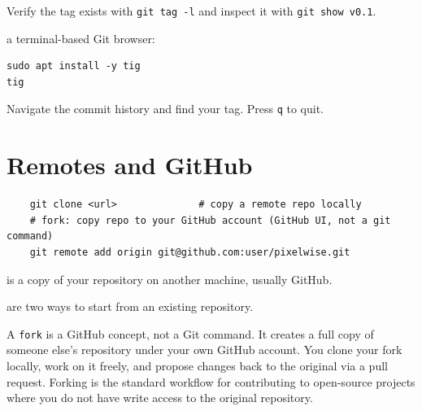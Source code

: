 Verify the tag exists with \texttt{git tag -l} and inspect it with \texttt{git show v0.1}.

 a terminal-based Git browser:

\begin{verbatim}
sudo apt install -y tig
tig
\end{verbatim}

Navigate the commit history and find your tag. Press \texttt{q} to quit.



\newpage
\section{Remotes and GitHub}




\begin{verbatim}
    git clone <url>              # copy a remote repo locally
    # fork: copy repo to your GitHub account (GitHub UI, not a git command)
    git remote add origin git@github.com:user/pixelwise.git
\end{verbatim}

 is a copy of your repository on another machine, usually GitHub.

 are two ways to 
start from an existing repository.

A \texttt{fork} is a GitHub concept, not a Git command.
It creates a full copy of someone else's repository under your own GitHub account.
You clone your fork locally, work on it freely, and propose changes back to the original via a pull request.
Forking is the standard workflow for contributing to open-source projects where you do not have write access to the original repository.


